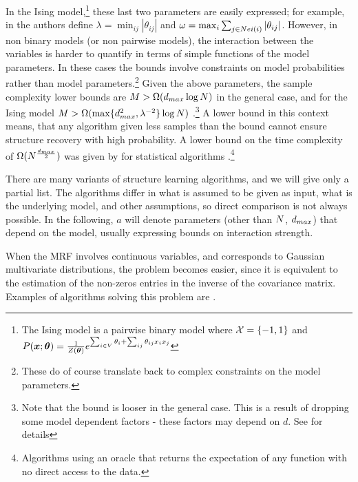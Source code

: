 In the Ising model,\footnote{The Ising model is a pairwise binary model where ${\cal X} = \{-1,1\}$ and $P(\boldsymbol{x};\boldsymbol{\theta}) = \frac{1}{Z(\boldsymbol{\theta})} e^{\sum_{i \in V}\theta_i + \sum_{ij}\theta_{ij}x_ix_j}$} these last two parameters are easily expressed; for example, in \cite{santhanam2012information} the authors define $\lambda =
\min_{ij} |\theta_{ij}|$ and $\omega = \max_i \sum_{j \in Nei(i)} |\theta_{ij}|$.
However, in non binary models (or non pairwise models), the interaction between the variables is harder to quantify in terms of simple functions of the model parameters.
In these cases the bounds involve constraints on model probabilities rather than model parameters.\footnote{These do of course translate back to complex constraints on the model parameters.}
Given the above parameters, the sample complexity lower bounds are $M > \Omega(d_{max} \log N)$ \cite{bresler2008reconstruction} in the general case, and for the Ising model $M > \Omega(\max\{d_{max}^2, \lambda^{-2}\}\log N)$ \cite{santhanam2012information}.\footnote{Note that the bound is looser in the general case. This is a result of dropping some model dependent factors - these factors may depend on $d$. See \cite{bresler2008reconstruction} for details}
A lower bound in this context means, that any algorithm given less samples than the bound cannot ensure structure recovery with high probability.
A lower bound on the time complexity of $\Omega(N^{\frac{d_{max}}{2}})$ was given by \cite{bresler2014structure} for statistical algorithms \cite{feldman2013statistical}.\footnote{Algorithms using an oracle that returns the expectation of any function with no direct access to the data.}

There are many variants of structure learning algorithms, and we will give only a partial list.
The algorithms differ in what is assumed to be given as input, what is the underlying model, and other assumptions, so direct comparison is not always possible.
In the following, $a$ will denote parameters (other than $N$, $d_{max}$) that depend on the model, usually expressing bounds on interaction strength.

When the MRF involves continuous variables, and corresponds to Gaussian multivariate distributions, the problem becomes easier, since it is equivalent to the estimation of the non-zeros entries in the inverse of the covariance matrix.
Examples of algorithms solving this problem are \cite{meinshausen2006high, yuan2007model, friedman2008sparse}. 


